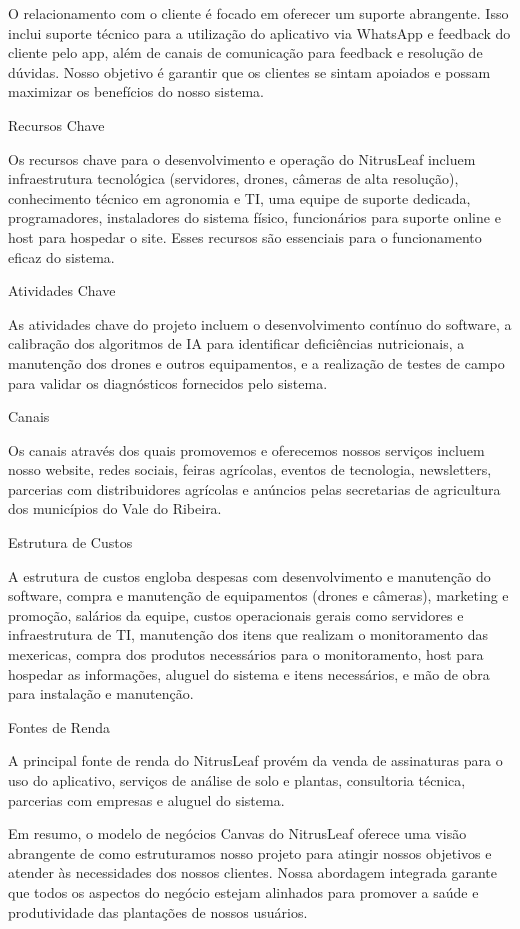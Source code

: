 \documentclass[
  a4paper,%
  12pt,%
  english,%
  brazilian,%
]{article}
\begin{document}
O relacionamento com o cliente é focado em oferecer um suporte abrangente. Isso inclui suporte técnico para a utilização do aplicativo via WhatsApp e feedback do cliente pelo app, além de canais de comunicação para feedback e resolução de dúvidas. Nosso objetivo é garantir que os clientes se sintam apoiados e possam maximizar os benefícios do nosso sistema.

Recursos Chave

Os recursos chave para o desenvolvimento e operação do NitrusLeaf incluem infraestrutura tecnológica (servidores, drones, câmeras de alta resolução), conhecimento técnico em agronomia e TI, uma equipe de suporte dedicada, programadores, instaladores do sistema físico, funcionários para suporte online e host para hospedar o site. Esses recursos são essenciais para o funcionamento eficaz do sistema.

Atividades Chave

As atividades chave do projeto incluem o desenvolvimento contínuo do software, a calibração dos algoritmos de IA para identificar deficiências nutricionais, a manutenção dos drones e outros equipamentos, e a realização de testes de campo para validar os diagnósticos fornecidos pelo sistema.

Canais

Os canais através dos quais promovemos e oferecemos nossos serviços incluem nosso website, redes sociais, feiras agrícolas, eventos de tecnologia, newsletters, parcerias com distribuidores agrícolas e anúncios pelas secretarias de agricultura dos municípios do Vale do Ribeira.

Estrutura de Custos

A estrutura de custos engloba despesas com desenvolvimento e manutenção do software, compra e manutenção de equipamentos (drones e câmeras), marketing e promoção, salários da equipe, custos operacionais gerais como servidores e infraestrutura de TI, manutenção dos itens que realizam o monitoramento das mexericas, compra dos produtos necessários para o monitoramento, host para hospedar as informações, aluguel do sistema e itens necessários, e mão de obra para instalação e manutenção.

Fontes de Renda

A principal fonte de renda do NitrusLeaf provém da venda de assinaturas para o uso do aplicativo, serviços de análise de solo e plantas, consultoria técnica, parcerias com empresas e aluguel do sistema.

Em resumo, o modelo de negócios Canvas do NitrusLeaf oferece uma visão abrangente de como estruturamos nosso projeto para atingir nossos objetivos e atender às necessidades dos nossos clientes. Nossa abordagem integrada garante que todos os aspectos do negócio estejam alinhados para promover a saúde e produtividade das plantações de nossos usuários.
\centering
\end{document}
